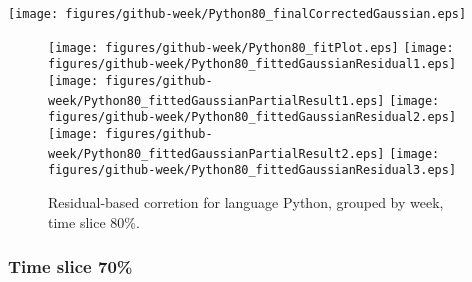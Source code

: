 \begin{center}
{\texttt{[image: figures/github-week/Python80\_finalCorrectedGaussian.eps]}}
\end{center}

\FloatBarrier

\begin{figure}[t]
\centering
{}
{\texttt{[image: figures/github-week/Python80\_fitPlot.eps]}}
{\texttt{[image: figures/github-week/Python80\_fittedGaussianResidual1.eps]}}
{\texttt{[image: figures/github-week/Python80\_fittedGaussianPartialResult1.eps]}}
{\texttt{[image: figures/github-week/Python80\_fittedGaussianResidual2.eps]}}
{\texttt{[image: figures/github-week/Python80\_fittedGaussianPartialResult2.eps]}}
{\texttt{[image: figures/github-week/Python80\_fittedGaussianResidual3.eps]}}
\caption{Residual-based corretion for language Python, grouped by week, time slice 80\%.}
\end{figure}


\FloatBarrier


\subsubsection{Time slice 70\%}

